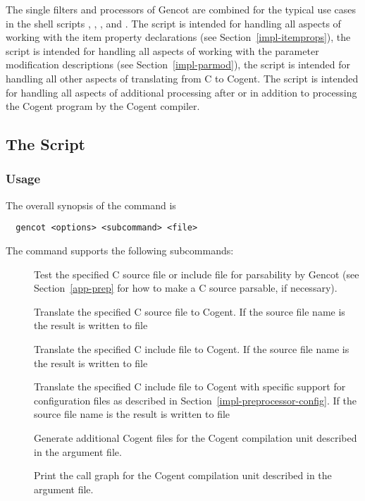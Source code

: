 The single filters and processors of Gencot are combined for the typical use cases in the shell scripts
, , , and . The script  is intended for handling all 
aspects of working with the item property declarations (see Section~\ref{impl-itemprops}), the script  
is intended for handling all aspects
of working with the parameter modification descriptions (see Section~\ref{impl-parmod}), the script
 is intended for handling all other aspects of translating from C to Cogent. The script 
is intended for handling all aspects of additional processing after or in addition to processing the Cogent program by the 
Cogent compiler.

\subsection{The  Script}
\label{impl-all-gencot}

\subsubsection{Usage}

The overall synopsis of the  command is
\begin{verbatim}
  gencot <options> <subcommand> <file>
\end{verbatim}

The  command supports the following subcommands:
\begin{description}
\item[] Test the specified C source file or include file for parsability by Gencot (see Section~\ref{app-prep} for how to 
make a C source parsable, if necessary).

\item[] Translate the specified C source file to Cogent. If the source file name is  the result is
written to file 

\item[] Translate the specified C include file to Cogent. If the source file name is  the result is
written to file 

\item[] Translate the specified C include file to Cogent with specific support for configuration files as described
in Section~\ref{impl-preprocessor-config}. If the source file name is  the result is
written to file 

\item[] Generate additional Cogent files for the Cogent compilation unit described in the argument file.

\item[] Print the call graph for the Cogent compilation unit described in the argument file.

\end{description}

